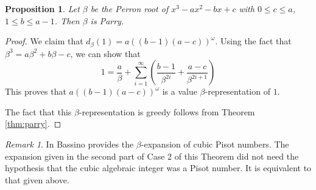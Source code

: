 \documentclass[12pt]{article}
\theoremstyle{plain}
\newtheorem{proposition}[theorem]{Proposition}
\theoremstyle{remark}
\newtheorem{remark}[theorem]{Remark}
\begin{document}
\begin{proposition}
    Let $\beta$ be the Perron root of $x^3 - a x^2 - b x + c$ with $0 \leq c \leq a$, $1 \leq b \leq a -1$.
    Then $\beta$ is Parry.
\end{proposition}

\begin{proof}
    We claim that $d_{\beta}(1) = a ((b-1) (a-c))^\omega$.  %
    Using the fact that $\beta^3 = a \beta^2 +b \beta - c$, we can show that 
    \[1 = \frac{a}{\beta} + \sum_{i=1}^\infty \left(\frac{b-1}{\beta^{2i}}+\frac{a-c}{\beta^{2i+1}}\right) \]
    This proves that $a ((b-1) (a-c))^\omega$ is a value $\beta$-representation of $1$. 

    The fact that this $\beta$-representation is greedy follows from Theorem \ref{thm:parry}. 
\end{proof}

\begin{remark}
In \cite[Theorem 2]{Bassino02} Bassino provides the $\beta$-expansion of cubic Pisot numbers.
The expansion given in the second part of Case 2 of this Theorem did not need the hypothesis that the cubic algebraic integer was a Pisot number.  It is equivalent to that given above.
\end{remark}
\end{document}
